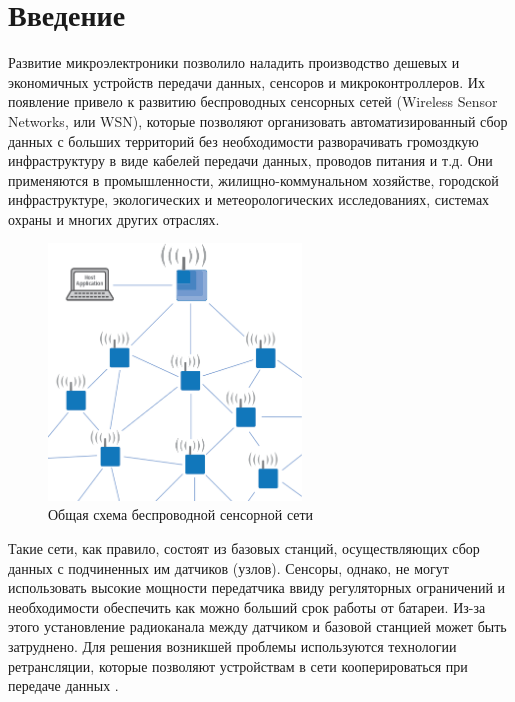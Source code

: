 \documentclass[a4paper,12pt,oneside]{scrartcl}
\begin{document}

\cleardoublepage


\tableofcontents
\listoffigures
\listoftables

\cleardoublepage

\section{Введение}
Развитие микроэлектроники позволило наладить производство дешевых и экономичных устройств передачи данных, сенсоров и микроконтроллеров. Их появление привело к развитию беспроводных сенсорных сетей (Wireless Sensor Networks, или WSN), которые позволяют организовать автоматизированный сбор данных с больших территорий без необходимости разворачивать громоздкую инфраструктуру в виде кабелей передачи данных, проводов питания и т.д. Они применяются в промышленности, жилищно-коммунальном хозяйстве, городской инфраструктуре, экологических и метеорологических исследованиях, системах охраны и многих других отраслях.

\begin{figure}[!htb]
    \centering
    \includegraphics[width=0.6\textwidth]{pics/1.png}
    \caption{Общая схема беспроводной сенсорной сети}
    \label{fig:WSN}
\end{figure}

Такие сети, как правило, состоят из базовых станций, осуществляющих сбор данных с подчиненных им датчиков (узлов). Сенсоры, однако, не могут использовать высокие мощности передатчика ввиду регуляторных ограничений и необходимости обеспечить как можно больший срок работы от батареи. Из-за этого установление радиоканала между датчиком и базовой станцией может быть затруднено. Для решения возникшей проблемы используются технологии ретрансляции, которые позволяют устройствам в сети кооперироваться при передаче данных \cite{B1}.
\end{document}
